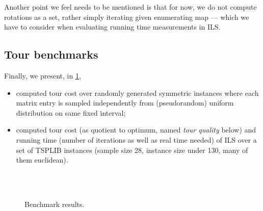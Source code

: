 \documentclass[titlepage,twoside,index=totoc,bibliography=totoc]{scrartcl}
\numberwithin{equation}{section}
\numberwithin{figure}{section}
\numberwithin{table}{section}
\let\defstyle\itshape
\begin{document}
Another point we feel needs to be mentioned is that for now, we do not
compute rotations as a set, rather simply iterating given enumerating map
--- which we have to consider when evaluating running time measurements in
ILS.

\subsection{Tour benchmarks}

Finally, we present, in \cref{fig:benchTSPLIB},%
\begin{itemize}
  \item %
    computed tour cost over
    randomly generated symmetric instances
    where each matrix entry is sampled independently from
    (pseudorandom) uniform distribution on same fixed interval;
  \item %
    computed tour cost (as quotient to optimum,
    named {\defstyle tour quality} below) and running time
    (number of iterations as well as real time needed)
    of ILS over a set of TSPLIB instances
    (sample size 28, instance size under 130, many of them euclidean).
\end{itemize}


\begin{figure}[htbp]
  \centering

    \null\hfill%
    \hfill\null\\
    \null\hfill%
    \hfill\null\\
    \null\hfill%
\caption{Benchmark results.}
\label{fig:benchTSPLIB}
\end{figure}
\end{document}
